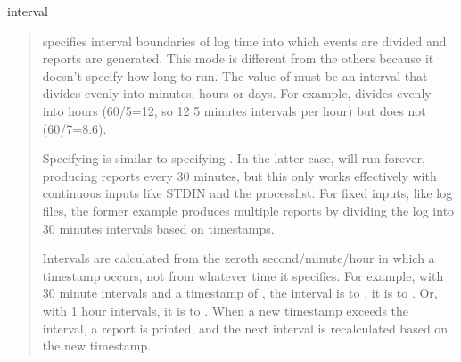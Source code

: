 \documentclass[letterpaper,10pt,english]{sphinxmanual}
\begin{document}
\begin{fulllineitems}
\sphinxAtStartPar
interval
\begin{quote}

\sphinxAtStartPar
{\hyperref[\detokenize{mariadb-query-digest:cmdoption-mariadb-query-digest-run-time}]{}} specifies interval boundaries of log time into which events
are divided and reports are generated.  This mode is different from the
others because it doesn’t specify how long to run.  The value of
{\hyperref[\detokenize{mariadb-query-digest:cmdoption-mariadb-query-digest-run-time}]{}} must be an interval that divides evenly into minutes, hours
or days.  For example,  divides evenly into hours (60/5=12, so 12
5 minutes intervals per hour) but  does not (60/7=8.6).

\sphinxAtStartPar
Specifying  is
similar to specifying .
In the latter case,  will run forever, producing reports every
30 minutes, but this only works effectively with  continuous inputs like
STDIN and the processlist.  For fixed inputs, like log files, the former
example produces multiple reports by dividing the log into 30 minutes
intervals based on timestamps.

\sphinxAtStartPar
Intervals are calculated from the zeroth second/minute/hour in which a
timestamp occurs, not from whatever time it specifies.  For example,
with 30 minute intervals and a timestamp of , the interval
is   to , it is  to .
Or, with 1 hour intervals, it is  to .
When a new timestamp exceeds the interval, a report is printed, and the
next interval is recalculated based on the new timestamp.


\end{quote}
\end{fulllineitems}
\end{document}
